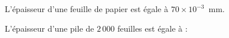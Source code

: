 
L'épaisseur d'une feuille de papier est égale à $70 \times 10^{-3}$~mm.

L'épaisseur d'une pile de $2\,000$ feuilles est égale à :

\smallskip

